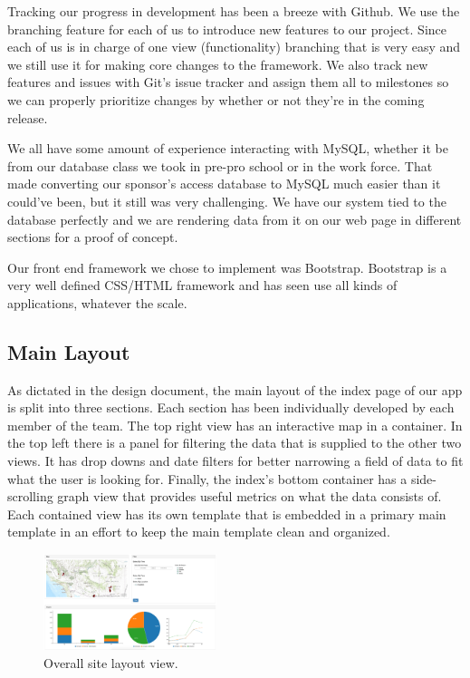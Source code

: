\documentclass[10pt,peerreview,onecolumn,draftclsnofoot,technote]{IEEEtran}
\begin{document}
Tracking our progress in development has been a breeze with Github.
We use the branching feature for each of us to introduce new features to our project.
Since each of us is in charge of one view (functionality) branching that is very easy and we still use it for making core changes to the framework.
We also track new features and issues with Git’s issue tracker and assign them all to milestones so we can properly prioritize changes by whether or not they’re in the coming release.

We all have some amount of experience interacting with MySQL, whether it be from our database class we took in pre-pro school or in the work force. That made converting our sponsor’s access database to MySQL much easier than it could’ve been, but it still was very challenging.
We have our system tied to the database perfectly and we are rendering data from it on our web page in different sections for a proof of concept.

Our front end framework we chose to implement was Bootstrap.
Bootstrap is a very well defined CSS/HTML framework and has seen use all kinds of applications, whatever the scale.

\subsection{Main Layout} %
As dictated in the design document, the main layout of the index page of our app is split into three sections.
Each section has been individually developed by each member of the team.
The top right view has an interactive map in a container.
In the top left there is a panel for filtering the data that is supplied to the other two views.
It has drop downs and date filters for better narrowing a field of data to fit what the user is looking for.
Finally, the index’s bottom container has a side-scrolling graph view that provides useful metrics on what the data consists of.
Each contained view has its own template that is embedded in a primary main template in an effort to keep the main template clean and organized.

\begin{figure}[h]
\caption{Overall site layout view.}
\centering
\includegraphics[width=0.45\textwidth]{images/figure_1.jpg}
\end{figure}
\end{document}
